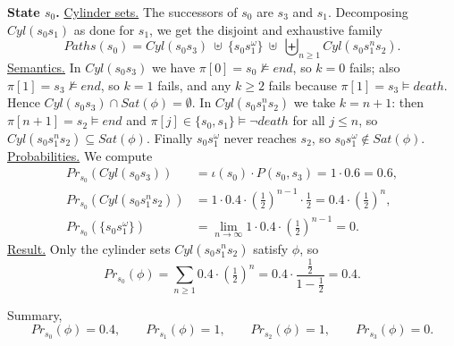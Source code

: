 \documentclass[12pt,a4paper]{article}
\begin{document}
\begin{description}
\medskip
\noindent\textbf{State $s_0$.}
\underline{Cylinder sets.} The successors of $s_0$ are $s_3$ and $s_1$. Decomposing $Cyl(s_0s_1)$ as done for $s_1$, we get the disjoint and exhaustive family
\[
Paths(s_0)=Cyl(s_0s_3)\ \uplus\ \{s_0s_1^\omega\}\ \uplus\ \biguplus_{n\ge1}Cyl(s_0s_1^ns_2).
\]
\underline{Semantics.} In $Cyl(s_0s_3)$ we have $\pi[0]=s_0\nvDash end$, so $k=0$ fails; also $\pi[1]=s_3\nvDash end$, so $k=1$ fails, and any $k\ge2$ fails because $\pi[1]=s_3\vDash death$. Hence $Cyl(s_0s_3)\cap Sat(\phi)=\emptyset$. In $Cyl(s_0s_1^ns_2)$ we take $k=n+1$: then $\pi[n+1]=s_2\vDash end$ and $\pi[j]\in\{s_0,s_1\}\vDash\lnot death$ for all $j\le n$, so $Cyl(s_0s_1^ns_2)\subseteq Sat(\phi)$. Finally $s_0s_1^\omega$ never reaches $s_2$, so $s_0s_1^\omega\notin Sat(\phi)$.
\underline{Probabilities.} We compute
\begin{align*}
Pr_{s_0}(Cyl(s_0s_3))&=\iota(s_0)\cdot P(s_0,s_3)=1\cdot0.6=0.6,\\
Pr_{s_0}(Cyl(s_0s_1^ns_2))&=1\cdot0.4\cdot\left(\tfrac12\right)^{n-1}\cdot\tfrac12=0.4\cdot\left(\tfrac12\right)^{n},\\
Pr_{s_0}(\{s_0s_1^\omega\})&=\lim_{n\to\infty}1\cdot0.4\cdot\left(\tfrac12\right)^{n-1}=0 .
\end{align*}
\underline{Result.} Only the cylinder sets $Cyl(s_0s_1^ns_2)$ satisfy $\phi$, so
\[
Pr_{s_0}(\phi)=\sum_{n\ge1}0.4\cdot\left(\tfrac12\right)^{n}=0.4\cdot\frac{\tfrac12}{1-\tfrac12}=0.4 .
\]

\medskip
\noindent Summary,
\[
Pr_{s_0}(\phi)=0.4,\qquad Pr_{s_1}(\phi)=1,\qquad Pr_{s_2}(\phi)=1,\qquad Pr_{s_3}(\phi)=0 .
\]
\color{black}
\fi

\end{description}
\end{document}
